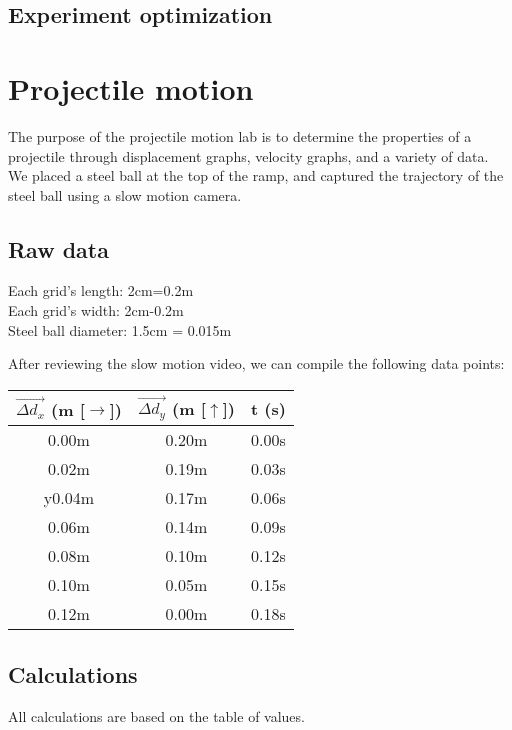 \documentclass[a4paper,12pt]{article}
\begin{document}
	\subsection{Experiment optimization}
	
	\newpage
	
	\section{Projectile motion}
	The purpose of the projectile motion lab is to determine the properties of a projectile through displacement graphs, velocity graphs, and a variety of data. We placed a steel ball at the top of the ramp, and captured the trajectory of the steel ball using a slow motion camera.
	
	\subsection{Raw data}
	Each grid's length: 2cm=0.2m\\
	Each grid's width: 2cm-0.2m\\
	Steel ball diameter: 1.5cm = 0.015m
	
	After reviewing the slow motion video, we can compile the following data points:
	\begin{center}
		\begin{tabular}{ |c|c|c| } 
			\hline
			$\vec{\Delta d_x}$ (m [$\rightarrow$]) & $\vec{\Delta d_y}$ (m [$\uparrow$]) & t (s)\\ 
			\hline\hline
			0.00m & 0.20m & 0.00s\\
			\hline 
			0.02m & 0.19m & 0.03s\\ 
			\hline
			y0.04m & 0.17m & 0.06s\\
			\hline
			0.06m & 0.14m & 0.09s \\
			\hline
			0.08m & 0.10m & 0.12s\\
			\hline
			0.10m & 0.05m & 0.15s \\
			\hline
			0.12m & 0.00m & 0.18s\\
			\hline
		\end{tabular} 
	\end{center}
	\bigskip
	
	\newpage
	
	\subsection{Calculations}
	All calculations are based on the table of values. 
\end{document}
